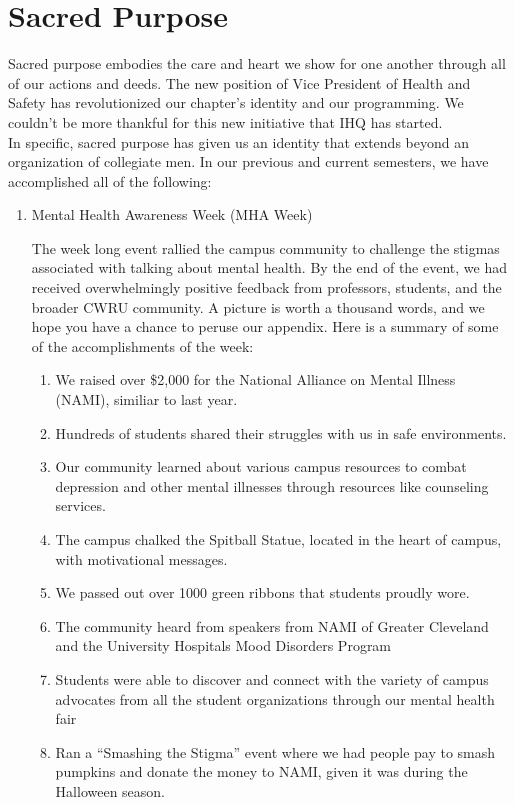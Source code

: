 \chapter{Sacred Purpose}

  Sacred purpose embodies the care and heart we show for one another through all of our actions and deeds. The new position of Vice President of Health and Safety has revolutionized our chapter's identity and our programming. We couldn't be more thankful for this new initiative that IHQ has started. \\

  In specific, sacred purpose has given us an identity that extends beyond an organization of collegiate men. In our previous and current semesters, we have accomplished all of the following:
  
  \begin{enumerate}
    \item Mental Health Awareness Week (MHA Week)
  	
  	The week long event rallied the campus community to challenge the stigmas associated with talking about mental health. By the end of the event, we had received overwhelmingly positive feedback from professors, students, and the broader CWRU community.  A picture is worth a thousand words, and we hope you have a chance to peruse our appendix. Here is a summary of some of the accomplishments of the week:
  	
  	\begin{enumerate}
	      \item We raised over \$2,000 for the National Alliance on Mental Illness (NAMI), similiar to last year.
	      \item Hundreds of students shared their struggles with us in safe environments.  		
	      \item Our community learned about various campus resources to combat depression and other mental illnesses through resources like counseling services.	      
	      \item The campus chalked the Spitball Statue, located in the heart of campus, with motivational messages.
	      \item We passed out over 1000 green ribbons that students proudly wore.
	      \item The community heard from speakers from NAMI of Greater Cleveland and the University Hospitals Mood Disorders Program
	      \item Students were able to discover and connect with the variety of campus advocates from all the student organizations through our mental health fair
	      \item Ran a ``Smashing the Stigma'' event where we had people pay to smash pumpkins and donate the money to NAMI, given it was during the Halloween season.
  	\end{enumerate}
  	

\end{enumerate}
